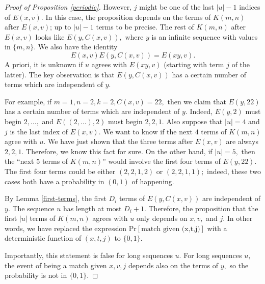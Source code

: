 \documentclass[11pt]{amsart} %
\begin{document}
\begin{proof}[Proof of Proposition \ref{periodic}]
However, $j$ might be one of the last $|u|-1$ indices of $E(x,v).$ In this case, the proposition depends on the terms of $K(m,n)$ after $E(x,v)$; up to $|u|-1$ terms to be precise. The rest of $K(m,n)$ after $E(x,v)$ looks like $E(y, C(x, v)),$ where $y$ is an infinite sequence with values in $\{m, n\}.$ We also have the identity
 \[E(x,v) E(y, C(x,v)) = E(xy, v).\]
A priori, it is unknown if $u$ agrees with $E(xy, v)$ (starting with term $j$ of the latter). The key observation is that $E(y, C(x,v))$ has a certain number of terms which are independent of $y.$ 

For example, if $m = 1, n = 2, k = 2, C(x,v) = 22,$ then we claim that $E(y, 22)$ has a certain number of terms which are independent of $y.$ Indeed, $E(y,2)$ must begin $2, \ldots,$ and $E((2, \ldots), 2)$ must begin $2, 2, 1.$ Also suppose that $|u| = 4$ and $j$ is the last index of $E(x,v).$ We want to know if the next $4$ terms of $K(m,n)$ agree with $u.$ We have just shown that the three terms after $E(x,v)$ are always $2, 2, 1.$ Therefore, we know this fact for sure. On the other hand, if $|u| = 5,$ then the ``next $5$ terms of $K(m,n)$'' would involve the first four terms of $E(y, 22).$ The first four terms could be either $(2,2,1,2)$ or $(2,2,1,1);$ indeed, these two cases both have a probability in $(0,1)$ of happening. 

By Lemma \ref{first-terms}, the first $D_i$ terms of $E(y, C(x,v))$ are independent of $y.$ The sequence $u$ has length at most $D_i + 1.$ Therefore, the proposition that the first $|u|$ terms of $K(m,n)$ agrees with $u$ only depends on $x, v, $ and $j.$  In other words, we have replaced the expression $ \text{Pr}[\text{match given (x,t,j)}]$ with a deterministic function of $(x,t,j)$ to $\{0,1\}.$ 

Importantly, this statement is false for long sequences $u.$ For long sequences $u,$ the event of being a match given $x, v, j$ depends also on the terms of $y,$ so the probability is not in $\{0,1\}.$





\end{proof}
\end{document}
